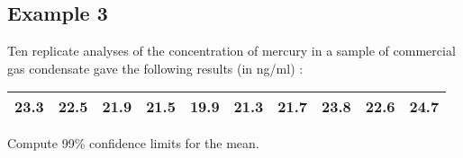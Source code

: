 \subsection{Example 3} Ten replicate analyses of the concentration
of mercury in a sample of commercial gas condensate gave the
following results (in ng/ml) :

\begin{center}
	\begin{tabular}{|c|c|c|c|c|c|c|c|c|c|}
		\hline
		23.3 & 22.5 & 21.9 & 21.5 & 19.9 & 21.3 & 21.7 & 23.8 & 22.6 &
		24.7\\
		\hline
	\end{tabular}
\end{center}

Compute 99\% confidence limits for the mean.


\newpage
